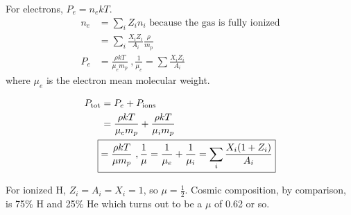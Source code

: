 For electrons, $P_e = n_ekT$.
\begin{align}
n_e &= \sum_i Z_in_i\textrm{ because the gas is fully ionized}\\
&= \sum_i \frac{X_iZ_i}{A_i}\frac{\rho}{m_p}\\
P_e &= \frac{\rho kT}{\mu_e m_p}~,\frac{1}{\mu_e} = \sum\frac{X_iZ_i}{A_i}
\end{align}
where $\mu_e$ is the electron mean molecular weight. 

\begin{align}
P_{\textrm{tot}} &= P_e + P_{\textrm{ions}} \\
&= \frac{\rho kT}{\mu_e m_p} +  \frac{\rho kT}{\mu_i m_p}\\
\Aboxed{&= \frac{\rho kT}{\mu m_p} ~,\frac{1}{\mu} = \frac{1}{\mu_e} + \frac{1}{\mu_i} = \sum_i \frac{X_i(1+Z_i)}{A_i}}
\end{align}

For ionized H, $Z_i = A_i = X_i = 1$, so $\mu = \frac{1}{2}$. Cosmic composition, by comparison, is 75\% H and 25\% He which turns out to be a $\mu$ of 0.62 or so.


